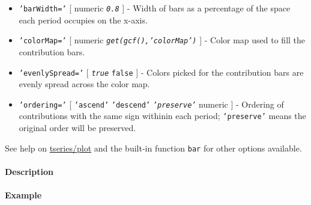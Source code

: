 \begin{itemize}
 \item
   \texttt{'barWidth='} {[} numeric \textbar{} \emph{\texttt{0.8}} {]} -
   Width of bars as a percentage of the space each period occupies on the
   x-axis.
 \item
   \texttt{'colorMap='} {[} numeric \textbar{}
   \emph{\texttt{get(gcf(),'colorMap')}} {]} - Color map used to fill the
   contribution bars.
 \item
   \texttt{'evenlySpread='} {[} \emph{\texttt{true}} \textbar{}
   \texttt{false} {]} - Colors picked for the contribution bars are
   evenly spread across the color map.
 \item
   \texttt{'ordering='} {[} \texttt{'ascend'} \textbar{}
   \texttt{'descend'} \textbar{} \emph{\texttt{'preserve'}} \textbar{}
   numeric {]} - Ordering of contributions with the same sign withinin
   each period; \texttt{'preserve'} means the original order will be
   preserved.
 \end{itemize}
 
 See help on \url{tseries/plot} and the built-in function \texttt{bar}
 for other options available.
 
 \paragraph{Description}
 
 \paragraph{Example}


